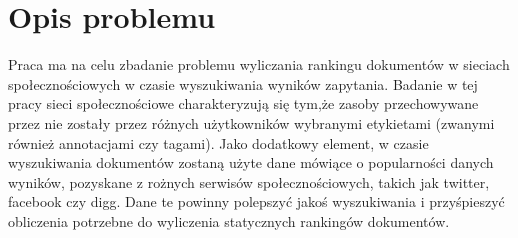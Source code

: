 \chapter{Opis problemu}

Praca ma na celu zbadanie problemu wyliczania rankingu dokumentów w sieciach społecznościowych w czasie wyszukiwania wyników zapytania. Badanie w tej pracy sieci społecznościowe charakteryzują się tym,że zasoby przechowywane przez nie zostały przez różnych użytkowników wybranymi etykietami (zwanymi również annotacjami czy tagami). Jako dodatkowy element, w czasie wyszukiwania dokumentów zostaną użyte dane mówiące o popularności danych wyników, pozyskane z rożnych serwisów społecznościowych, takich jak twitter, facebook czy digg. Dane te powinny polepszyć jakoś wyszukiwania i przyśpieszyć obliczenia potrzebne do wyliczenia statycznych rankingów dokumentów. 